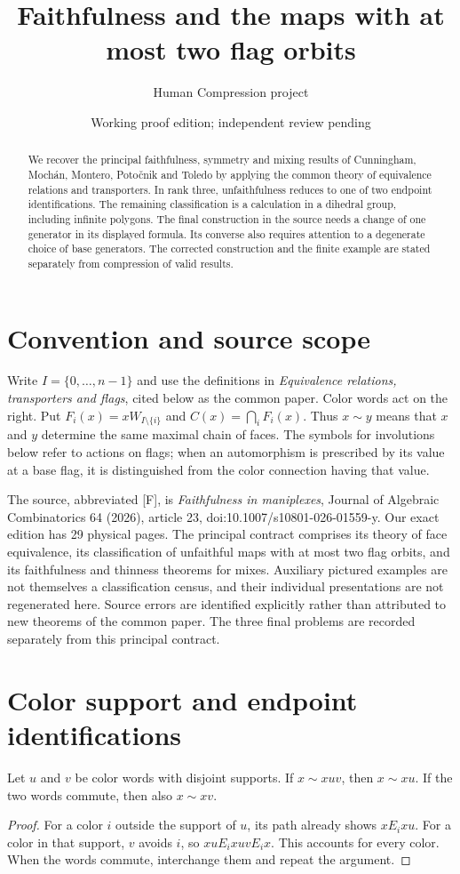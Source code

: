 \documentclass[a4paper,11pt]{article}
\title{Faithfulness and the maps with at most two flag orbits}
\author{Human Compression project}\date{Working proof edition; independent review pending}
\begin{document}
\maketitle
\begin{abstract}
We recover the principal faithfulness, symmetry and mixing results of
Cunningham, Moch\'an, Montero, Poto\v cnik and Toledo by applying the
common theory of equivalence relations and transporters. In rank three,
unfaithfulness reduces to one of two endpoint identifications. The remaining
classification is a calculation in a dihedral group, including infinite
polygons. The final construction in the source needs a change of one
generator in its displayed formula. Its converse also requires attention
to a degenerate choice of base generators. The corrected construction and
the finite example are stated separately from compression of valid results.
\end{abstract}

\section{Convention and source scope}
Write $I=\{0,\ldots,n-1\}$ and use the definitions in
\emph{Equivalence relations, transporters and flags}, cited below as the
common paper. Color words act on the right. Put
$F_i(x)=xW_{I\setminus\{i\}}$ and $C(x)=\bigcap_i F_i(x)$.
Thus $x\sim y$ means that $x$ and $y$ determine the same maximal chain
of faces. The symbols for involutions below refer to actions on flags;
when an automorphism is prescribed by its value at a base flag, it is
distinguished from the color connection having that value.

The source, abbreviated [F], is \emph{Faithfulness in maniplexes}, Journal
of Algebraic Combinatorics 64 (2026), article 23,
doi:10.1007/s10801-026-01559-y. Our exact edition has 29 physical pages.
The principal contract comprises its theory of face equivalence, its
classification of unfaithful maps with at most two flag orbits, and its
faithfulness and thinness theorems for mixes. Auxiliary pictured examples
are not themselves a classification census, and their individual
presentations are not regenerated here. Source errors are identified
explicitly rather than attributed to new theorems of the common paper.
The three final problems are recorded separately from this principal
contract.

\section{Color support and endpoint identifications}
\begin{lemma}\label{support}
Let $u$ and $v$ be color words with disjoint supports. If $x\sim xuv$,
then $x\sim xu$. If the two words commute, then also $x\sim xv$.
\end{lemma}
\begin{proof}
For a color $i$ outside the support of $u$, its path already shows
$xE_i xu$. For a color in that support, $v$ avoids $i$, so
$xuE_i xuvE_i x$. This accounts for every color. When the words
commute, interchange them and repeat the argument.
\end{proof}
\end{document}
